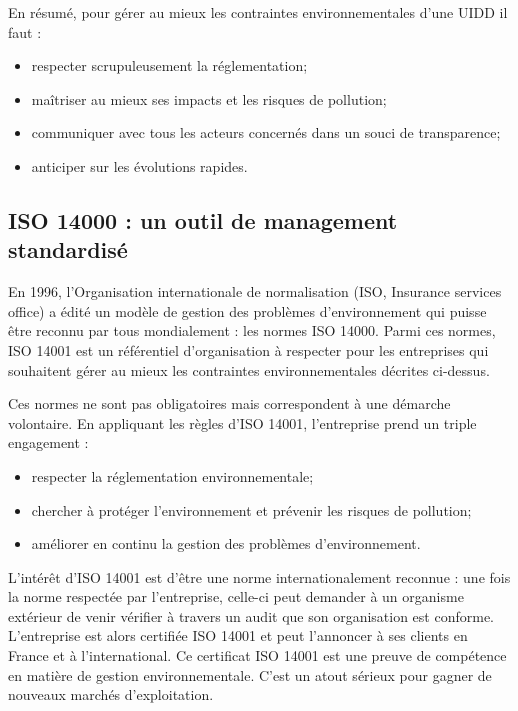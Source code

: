 En résumé, pour gérer au mieux les contraintes environnementales d’une UIDD il faut :

\begin{itemize}
\item respecter scrupuleusement la réglementation;
\item  maîtriser au mieux ses impacts et les risques de pollution;
\item communiquer avec tous les acteurs concernés dans un souci de transparence;
\item anticiper sur les évolutions rapides.
 \end{itemize}

\subsection{ISO 14000 : un outil de management standardisé}

En 1996, l’Organisation internationale de normalisation (ISO, Insurance services office) a édité un modèle de gestion des problèmes d’environnement qui puisse être reconnu par tous mondialement : les normes ISO 14000.
Parmi ces normes, ISO 14001 est un référentiel d’organisation à respecter pour les entreprises qui souhaitent gérer au mieux les contraintes environnementales décrites ci-dessus.

Ces normes ne sont pas obligatoires mais correspondent à une démarche volontaire. En appliquant les règles d’ISO 14001, l’entreprise prend un triple engagement :

\begin{itemize}
\item respecter la réglementation environnementale;
\item  chercher à protéger l’environnement et prévenir les risques de pollution;
\item  améliorer en continu la gestion des problèmes d’environnement.
\end{itemize} 

L’intérêt d’ISO 14001 est d’être une norme internationalement reconnue : une fois la norme respectée par l’entreprise, celle-ci peut demander à un organisme extérieur de venir vérifier à travers un audit que son organisation est conforme. L’entreprise est alors certifiée ISO 14001 et peut l’annoncer à ses clients en France et à l’international.
Ce certificat ISO 14001 est une preuve de compétence en matière de gestion environnementale. C’est un atout sérieux pour gagner de nouveaux marchés d’exploitation.


